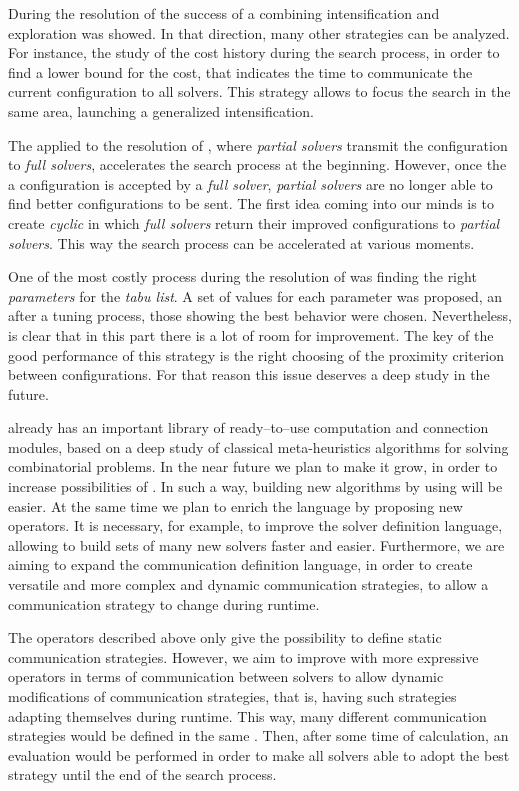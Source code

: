 During the resolution of \sgp{} the success of a \comstr{} combining intensification and exploration was showed. In that direction, many other strategies can be analyzed. For instance, the study of the cost history during the search process, in order to find a lower bound for the cost, that indicates the time to communicate the current configuration to all solvers. This strategy allows to focus the search in the same area, launching a generalized intensification.

The \comstr{} applied to the resolution of \nqp{}, where \textit{partial solvers} transmit the configuration to \textit{full solvers}, accelerates the search process at the beginning. However, once the a configuration is accepted by a \textit{full solver}, \textit{partial solvers} are no longer able to find better configurations to be sent. The first idea coming into our minds is to create \textit{cyclic} \comstrs{} in which \textit{full solvers} return their improved configurations to \textit{partial solvers}. This way the search process can be accelerated at various moments. 

One of the most costly process during the resolution of \grp{} was finding the right {\it parameters} for the \textit{tabu list}. A set of values for each parameter was proposed, an after a tuning process, those showing the best behavior were chosen. Nevertheless, is clear that in this part there is a lot of room for improvement. The key of the good performance of this strategy is the right choosing of the proximity criterion between configurations. For that reason this issue deserves a deep study in the future.

\posl{} already has an important library of ready--to--use computation and connection modules, based on a deep study of classical meta-heuristics algorithms for solving combinatorial problems. In the near future we plan to make it grow, in order to increase possibilities of \posl{}. In such a way, building new algorithms by using \posl{} will be easier. At the same time we plan to enrich the language by proposing new operators. It is necessary, for example, to improve the solver definition language, allowing to build sets of many new solvers faster and easier. Furthermore, we are aiming to expand the communication definition language, in order to create versatile and more complex and dynamic communication strategies, to allow a communication strategy to change during runtime.

The operators described above only give the possibility to define static communication strategies. However, we aim to improve \posl{} with more expressive operators in terms of communication between solvers to allow dynamic modifications of communication strategies, that is, having such strategies adapting themselves during runtime. This way, many different communication strategies would be defined in the same \soset. Then, after some time of calculation, an evaluation would be performed in order to make all solvers able to adopt the best strategy until the end of the search process.

